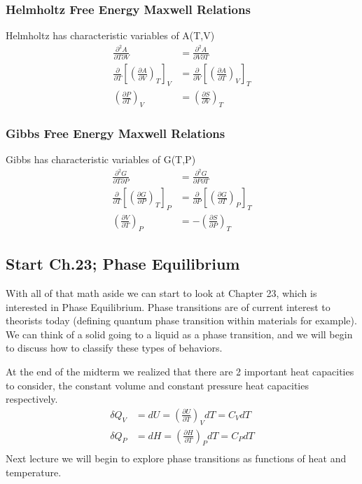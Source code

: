 \documentclass{article}
\begin{document}
\subsubsection*{Helmholtz Free Energy Maxwell Relations}
Helmholtz has characteristic variables of A(T,V)
\begin{equation}
\begin{split}
\frac{\partial ^2 A}{\partial T \partial V} &= \frac{\partial ^2 A}{\partial V \partial T} \\
\frac{\partial }{\partial T}\left[\left(\frac{\partial A}{\partial V}\right)_T\right]_V &= \frac{\partial}{\partial V}\left[\left(\frac{\partial A }{\partial T}\right)_V\right]_T \\
\left(\frac{\partial P}{\partial T}\right)_V &= \left(\frac{\partial S}{\partial V}\right)_T
\end{split}
\end{equation}

\subsubsection*{Gibbs Free Energy Maxwell Relations}
Gibbs has characteristic variables of G(T,P)
\begin{equation}
\begin{split}
\frac{\partial ^2 G}{\partial T \partial P} &= \frac{\partial ^2 G}{\partial P \partial T} \\
\frac{\partial }{\partial T}\left[\left(\frac{\partial G}{\partial P}\right)_T\right]_P &= \frac{\partial}{\partial P}\left[\left(\frac{\partial G }{\partial T}\right)_P\right]_T \\
\left(\frac{\partial V}{\partial T}\right)_P &= -\left(\frac{\partial S}{\partial P}\right)_T
\end{split}
\end{equation}

\subsection*{Start Ch.23; Phase Equilibrium}
With all of that math aside we can start to look at Chapter 23, which is interested in Phase Equilibrium. 
Phase transitions are of current interest to theorists today (defining quantum phase transition within materials for example). 
We can think of a solid going to a liquid as a phase transition, and we will begin to discuss how to classify these types of behaviors. 

At the end of the midterm we realized that there are 2 important heat capacities to consider, the constant volume and constant pressure heat capacities respectively. 
\begin{equation}
\begin{split}
\delta Q_V &= dU = \left(\frac{\partial U}{\partial T}\right)_VdT = C_VdT \\
\delta Q_P &= dH = \left(\frac{\partial H}{\partial T}\right)_PdT = C_PdT \\
\end{split} 
\end{equation}
Next lecture we will begin to explore phase transitions as functions of heat and temperature. 
\end{document}
